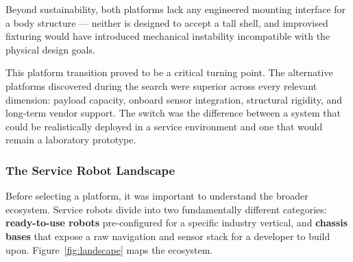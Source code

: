 \documentclass[11pt,a4paper]{article}
\begin{document}
Beyond sustainability, both platforms lack any engineered mounting interface for a body structure --- neither is designed to accept a tall shell, and improvised fixturing would have introduced mechanical instability incompatible with the physical design goals.

This platform transition proved to be a critical turning point. The alternative platforms discovered during the search were superior across every relevant dimension: payload capacity, onboard sensor integration, structural rigidity, and long-term vendor support. The switch was the difference between a system that could be realistically deployed in a service environment and one that would remain a laboratory prototype.

\subsubsection{The Service Robot Landscape}

Before selecting a platform, it was important to understand the broader ecosystem. Service robots divide into two fundamentally different categories: \textbf{ready-to-use robots} pre-configured for a specific industry vertical, and \textbf{chassis bases} that expose a raw navigation and sensor stack for a developer to build upon. Figure~\ref{fig:landscape} maps the ecosystem.
\end{document}
